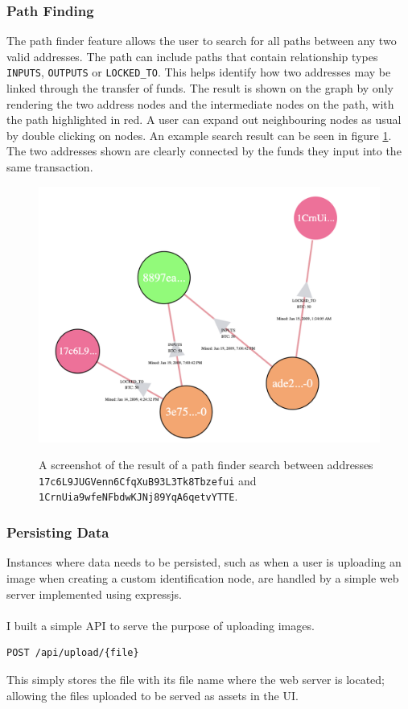 \subsubsection{Path Finding}
The path finder feature allows the user to search for all paths between any two valid addresses. The path can include paths that contain relationship types \texttt{INPUTS}, \texttt{OUTPUTS} or \texttt{LOCKED\_TO}. This helps identify how two addresses may be linked through the transfer of funds. The result is shown on the graph by only rendering the two address nodes and the intermediate nodes on the path, with the path highlighted in red. A user can expand out neighbouring nodes as usual by double clicking on nodes. An example search result can be seen in figure \ref{fig:path-search-result}. The two addresses shown are clearly connected by the funds they input into the same transaction. 

\begin{figure}[h!]
  \centering
  \includegraphics[width = 15cm]{./figures/ui-screenshots/path-find-result}\\[0.5cm] 
  \caption{A screenshot of the result of a path finder search between addresses \texttt{17c6L9JUGVenn6CfqXuB93L3Tk8Tbzefui} and \texttt{1CrnUia9wfeNFbdwKJNj89YqA6qetvYTTE}.}
  \label{fig:path-search-result}
\end{figure}

\subsubsection{Persisting Data}
Instances where data needs to be persisted, such as when a user is uploading an image when creating a custom identification node, are handled by a simple web server implemented using expressjs. 
\\\\
I built a simple API to serve the purpose of uploading images.
\begin{lstlisting}
POST /api/upload/{file}
\end{lstlisting}
This simply stores the file with its file name where the web server is located; allowing the files uploaded to be served as assets in the UI. 